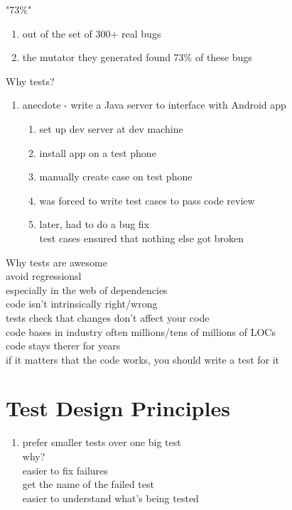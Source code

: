 \documentclass[10pt,usletter]{article}
\newcommand{\tab}[1][1cm]{\hspace*{#1}}
\begin{document}
"73\%"
\begin{enumerate}
\item out of the set of 300+ real bugs
\item the mutator they generated found 73\% of these bugs
\end{enumerate}

Why tests?
\begin{enumerate}
\item anecdote - write a Java server to interface with Android app
\begin{enumerate}
\item set up dev server at dev machine
\item install app on a test phone
\item manually create case on test phone
\item was forced to write test cases to pass code review
\item later, had to do a bug fix\\
\tab test cases ensured that nothing else got broken
\end{enumerate}
\end{enumerate}


Why tests are awesome\\
avoid regressionsl \\
especially in the web of dependencies\\
code isn't intrinsically right/wrong\\
tests check that changes don't affect your code\\
code bases in industry often millions/tens of millions of LOCs\\
code stays therer for years\\
if it matters that the code works, you should write a test for it\\
\section*{Test Design Principles}
\begin{enumerate}
\item prefer smaller tests over one big test\\
why?\\
easier to fix failures\\
get the name of the failed test\\
easier to understand what's being tested\\
\end{enumerate}
\end{document}
